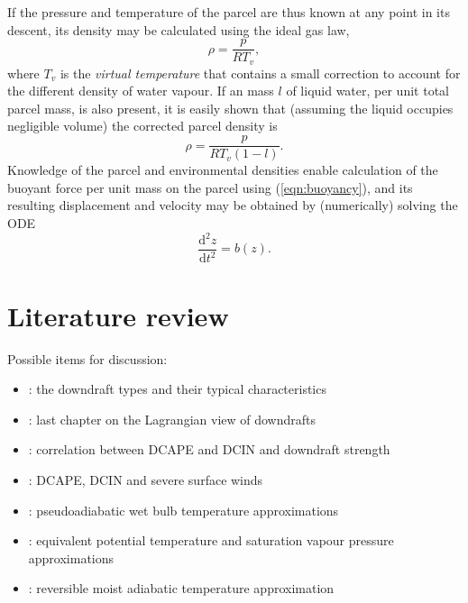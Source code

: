 \documentclass[12pt,titlepage]{article}
\begin{document}
If the pressure and temperature of the parcel are thus known at any
point in its descent, its density may be calculated using the ideal
gas law,
\begin{equation}
	\rho = \frac{p}{RT_v},
\end{equation}
where $T_v$ is the \emph{virtual temperature} that contains a small
correction to account for the different density of water vapour.
If an mass $l$ of liquid water, per unit total parcel mass, is also
present, it is easily shown that (assuming the liquid occupies
negligible volume) the corrected parcel density is
\begin{equation}
	\rho = \frac{p}{RT_v (1 - l)}.
\end{equation}
Knowledge of the parcel and environmental densities enable calculation
of the buoyant force per unit mass on the parcel using
(\ref{eqn:buoyancy}), and its resulting displacement and velocity may be
obtained by (numerically) solving the ODE
\begin{equation}
	\frac{\mathrm{d}^2 z}{\mathrm{d}t^2} = b(z).
\end{equation}


\section{Literature review}
Possible items for discussion:
\begin{itemize}
	\item \textcite{knupp_cotton_1985}: the downdraft types and their
		typical characteristics
	\item \textcite{thayer-calder_2013}: last chapter on the Lagrangian
		view of downdrafts
	\item \textcite{market_2017}: correlation between DCAPE and DCIN and
		downdraft strength
	\item \textcite{sumrall_2020}: DCAPE, DCIN and severe surface winds
	\item \textcite{davies-jones_2008}: pseudoadiabatic wet bulb
		temperature approximations
	\item \textcite{bolton_1980}: equivalent potential temperature
		and saturation vapour pressure approximations
	\item \textcite{saunders_1957}: reversible moist adiabatic
		temperature approximation
\end{itemize}
\end{document}

